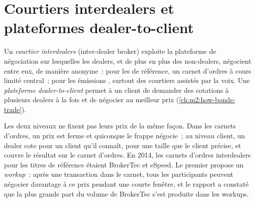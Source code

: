 \section{Courtiers interdealers et plateformes dealer-to-client}

\begin{definition}\label{def:m2:the-treasury-market:idb}
Un \emph{courtier interdealers} (inter-dealer broker) exploite la plateforme de négociation sur
lesquelles les dealers, et de plus en plus des non-dealers, négocient entre eux,
de manière anonyme~: pour les  de référence, un carnet d'ordres à cours limité central~;
pour les émissions , surtout des courtiers assistés par la voix. Une \emph{plateforme
dealer-to-client} permet à un client de demander des cotations à
plusieurs dealers à la fois et de négocier au meilleur prix (\cref{ch:m2:how-bonds-trade}).
\end{definition}

Les deux niveaux ne fixent pas leurs prix de la même façon. Dans les carnets d'ordres, un prix est ferme et
quiconque le frappe négocie~; au niveau client, un dealer cote pour un client qu'il connaît,
pour une taille que le client précise, et couvre le résultat sur le carnet d'ordres.
En 2014, les carnets d'ordres interdealers pour les titres de référence étaient BrokerTec
et eSpeed. Le premier propose un \emph{workup}~: après une transaction dans le carnet, tous les
participants peuvent négocier davantage à ce prix pendant une courte fenêtre, et le rapport
a constaté que la plus grande part du volume de BrokerTec s'est produite dans les workups.

